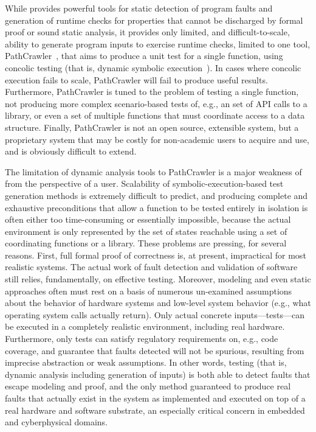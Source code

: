 While \framac{} provides powerful tools for static detection of program faults and generation of runtime checks for properties that cannot be discharged by formal proof or sound static analysis, it provides only limited, and difficult-to-scale, ability to generate program inputs to exercise runtime checks, limited to one tool, PathCrawler~\cite{WilliamsMMR05EDCC}, that aims to produce a unit test for a single function, using concolic testing (that is, dynamic symbolic execution~\cite{GodefroidKS05}).  In cases where concolic execution fails to scale, PathCrawler will fail to produce useful results.  Furthermore, PathCrawler is tuned to the problem of testing a single function, not producing more complex scenario-based tests of, e.g., an set of API calls to a library, or even a set of multiple functions that must coordinate access to a data structure.  Finally, PathCrawler is not an open source, extensible system, but a proprietary system that may be costly for non-academic users to acquire and use, and is obviously difficult to extend.

The limitation of dynamic analysis tools to PathCrawler is a major weakness of \framac from the perspective of a user.  Scalability of symbolic-execution-based test generation methods is extremely difficult to predict, and producing complete and exhaustive preconditions that allow a function to be tested entirely in isolation is often either too time-consuming or essentially impossible, because the actual environment is only represented by the set of states reachable using a set of coordinating functions or a library.  These problems are pressing, for several reasons.  First, full formal proof of correctness is, at present, impractical for most realistic systems.  The actual work of fault detection and validation of software still relies, fundamentally, on effective testing.  Moreover, modeling and even static approaches often must rest on a basis of numerous un-examined assumptions about the behavior of hardware systems and low-level system behavior (e.g., what operating system calls actually return).  Only actual concrete inputs---tests---can be executed in a completely realistic environment, including real hardware.  Furthermore, only tests can satisfy regulatory requirements on, e.g., code coverage, and guarantee that faults detected will not be spurious, resulting from imprecise abstraction or weak assumptions.  In other words, testing (that is, dynamic analysis including generation of inputs) is both able to detect faults that escape modeling and proof, and the only method guaranteed to produce real faults that actually exist in the system as implemented and executed on top of a real hardware and software substrate, an especially critical concern in embedded and cyberphysical domains.


